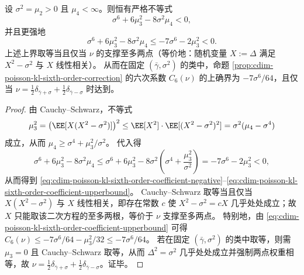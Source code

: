 \begin{proposition}\label{prop:cdim-poisson-kl-sixth-order-coefficient-negative}
设 \(\sigma^2=\mu_2>0\) 且 \(\mu_4<\infty\)。则恒有严格不等式
\begin{equation}\label{eq:cdim-poisson-kl-sixth-order-coefficient-negative}
\sigma^6+6\mu_3^2-8\sigma^2\mu_4<0,
\end{equation}
并且更强地
\begin{equation}\label{eq:cdim-poisson-kl-sixth-order-coefficient-upperbound}
\sigma^6+6\mu_3^2-8\sigma^2\mu_4\le -7\sigma^6-2\mu_3^2<0.
\end{equation}
上述上界取等当且仅当 \(\nu\) 的支撑至多两点（等价地：随机变量 \(X:=\Delta\) 满足 \(X^2-\sigma^2\) 与 \(X\) 线性相关）。
从而在固定 \((\bar\gamma,\sigma^2)\) 的类中，命题 \ref{prop:cdim-poisson-kl-sixth-order-correction} 的六次系数 \(C_6(\nu)\) 的上确界为 \(-7\sigma^6/64\)，且仅当 \(\nu=\tfrac12\delta_{\bar\gamma+\sigma}+\tfrac12\delta_{\bar\gamma-\sigma}\) 时达到。
\end{proposition}
\begin{proof}
由 Cauchy--Schwarz，不等式
\[
\mu_3^2=\bigl(\EE[X(X^2-\sigma^2)]\bigr)^2
\le \EE[X^2]\cdot \EE[(X^2-\sigma^2)^2]
=\sigma^2(\mu_4-\sigma^4)
\]
成立，从而 \(\mu_4\ge \sigma^4+\mu_3^2/\sigma^2\)。
代入得
\[
\sigma^6+6\mu_3^2-8\sigma^2\mu_4
\le
\sigma^6+6\mu_3^2-8\sigma^2\left(\sigma^4+\frac{\mu_3^2}{\sigma^2}\right)
=-7\sigma^6-2\mu_3^2<0,
\]
从而得到 \eqref{eq:cdim-poisson-kl-sixth-order-coefficient-negative}--\eqref{eq:cdim-poisson-kl-sixth-order-coefficient-upperbound}。
Cauchy--Schwarz 取等当且仅当 \(X(X^2-\sigma^2)\) 与 \(X\) 线性相关，即存在常数 \(c\) 使 \(X^2-\sigma^2=cX\) 几乎处处成立；故 \(X\) 只能取该二次方程的至多两根，等价于 \(\nu\) 支撑至多两点。
特别地，由 \eqref{eq:cdim-poisson-kl-sixth-order-coefficient-upperbound} 可得
\(
C_6(\nu)\le -7\sigma^6/64-\mu_3^2/32\le -7\sigma^6/64
\)。
若在固定 \((\bar\gamma,\sigma^2)\) 的类中取等，则需 \(\mu_3=0\) 且 Cauchy--Schwarz 取等，从而 \(\Delta^2=\sigma^2\) 几乎处处成立并强制两点权重相等，故 \(\nu=\tfrac12\delta_{\bar\gamma+\sigma}+\tfrac12\delta_{\bar\gamma-\sigma}\)。证毕。
\end{proof}

